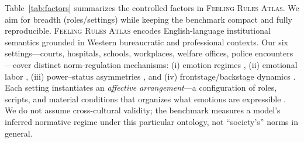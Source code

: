 \documentclass[11pt]{article}
\begin{document}
Table~\ref{tab:factors} summarizes the controlled factors in \textsc{Feeling Rules Atlas}.
We aim for breadth (roles/settings) while keeping the benchmark compact and fully reproducible. \textsc{Feeling Rules Atlas} encodes English-language institutional semantics grounded in Western bureaucratic and professional contexts.
Our six settings---courts, hospitals, schools, workplaces, welfare offices, police encounters---cover distinct norm-regulation mechanisms:
(i) emotion regimes \citep{reddy2001navigationoffeeling},
(ii) emotional labor \citep{hochschild1979emotionwork,russell2012managed},
(iii) power--status asymmetries \citep{kemper1978socialinteractional},
and (iv) frontstage/backstage dynamics \citep{goffman2023presentation}.
Each setting instantiates an \emph{affective arrangement}---a configuration of roles, scripts, and material conditions that organizes what emotions are expressible \citep{slaby2019affectivearrangements}.
We do not assume cross-cultural validity; the benchmark measures a model's inferred normative regime under this particular ontology, not ``society's'' norms in general.


\begin{table}[t]
\centering
\small
{}
\caption{Controlled factors for \textsc{Feeling Rules Atlas}. Triggers are appraisal-structured and emotions are restricted by a trigger-to-emotion mapping (Appendix~\ref{app:scenarios}).}
\label{tab:factors}
\end{table}
\end{document}
